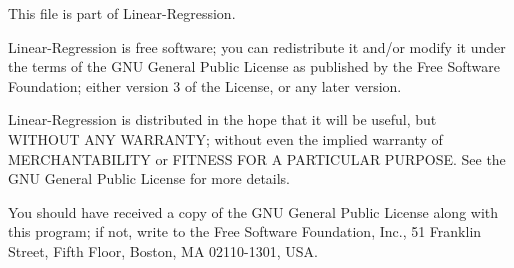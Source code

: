 This file is part of Linear-\/\+Regression.

Linear-\/\+Regression is free software; you can redistribute it and/or modify it under the terms of the G\+NU General Public License as published by the Free Software Foundation; either version 3 of the License, or any later version.

Linear-\/\+Regression is distributed in the hope that it will be useful, but W\+I\+T\+H\+O\+UT A\+NY W\+A\+R\+R\+A\+N\+TY; without even the implied warranty of M\+E\+R\+C\+H\+A\+N\+T\+A\+B\+I\+L\+I\+TY or F\+I\+T\+N\+E\+SS F\+OR A P\+A\+R\+T\+I\+C\+U\+L\+AR P\+U\+R\+P\+O\+SE. See the G\+NU General Public License for more details.

You should have received a copy of the G\+NU General Public License along with this program; if not, write to the Free Software Foundation, Inc., 51 Franklin Street, Fifth Floor, Boston, MA 02110-\/1301, U\+SA. 